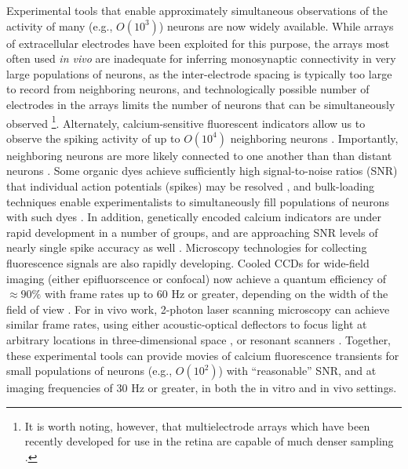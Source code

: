 \documentclass[aoas,preprint]{imsart}
\begin{document}
Experimental tools that enable approximately simultaneous observations of the activity of many (e.g., $O(10^3)$) neurons are now widely available. While arrays of extracellular electrodes have been exploited for this purpose, the arrays most often used \emph{in vivo} are inadequate for inferring monosynaptic connectivity in very large populations of neurons, as the inter-electrode spacing is typically too large to record from neighboring neurons, and technologically possible number of electrodes in the arrays limits the number of neurons that can be simultaneously observed \cite{HATS98,HARR03,Stein04,Santhanam06,Harris07}\footnote{It is worth noting, however, that multielectrode arrays which have been recently developed for use in the retina are capable of much denser sampling \cite{Berry2004,Litke2004,Petrusca07,PILL07}.}. Alternately, calcium-sensitive fluorescent indicators allow us to observe the spiking activity of up to $O(10^4)$ neighboring neurons \cite{Tsien89}.  Importantly, neighboring neurons are more likely connected to one another than than distant neurons \cite{Abeles91,Braitenberg1998}. Some organic dyes achieve sufficiently high signal-to-noise ratios (SNR) that individual action potentials (spikes) may be resolved \cite{ImagingManual}, and bulk-loading techniques enable experimentalists to simultaneously fill populations of neurons with such dyes \cite{StosiekKonnerth03}. In addition, genetically encoded calcium indicators are under rapid development in a number of groups, and are approaching SNR levels of nearly single spike accuracy as well \cite{WallaceHasan08}. Microscopy technologies for collecting fluorescence signals are also rapidly developing. Cooled CCDs for wide-field imaging (either epifluorscence or confocal) now achieve a quantum efficiency of $\approx 90 \%$ with frame rates up to $60$ Hz or greater, depending on the width of the field of view \cite{Djurisic04}. For in vivo work, 2-photon laser scanning microscopy can achieve similar frame rates, using either acoustic-optical deflectors to focus light at arbitrary locations in three-dimensional space \cite{ReddySaggau05,Iyer06,SalomeBourdieu06,ReddySaggau08}, or resonant scanners \cite{NguyenParker01}. Together, these experimental tools can provide movies of calcium fluorescence transients for small populations of neurons (e.g., $O(10^2)$) with ``reasonable'' SNR, and at imaging frequencies of $30$ Hz or greater, in both the in vitro and in vivo settings.
\end{document}
